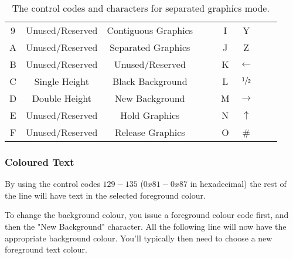 \begin{table}
\begin{tabular}{|c|c|c|c|c|c|c|c|c|}
 9 &Unused/Reserved&Contiguous Graphics		& \sepsix{\ff}{\bb}{\bb}{\ff}{\bb}{\bb} & \sepsix{\ff}{\bb}{\bb}{\ff}{\ff}{\bb} & I & Y           & \sepsix{\ff}{\bb}{\bb}{\ff}{\bb}{\ff} & \sepsix{\ff}{\bb}{\bb}{\ff}{\ff}{\ff}\\
 A &Unused/Reserved&Separated Graphics		& \sepsix{\bb}{\ff}{\bb}{\ff}{\bb}{\bb} & \sepsix{\bb}{\ff}{\bb}{\ff}{\ff}{\bb} & J & Z           & \sepsix{\bb}{\ff}{\bb}{\ff}{\bb}{\ff} & \sepsix{\bb}{\ff}{\bb}{\ff}{\ff}{\ff}\\
 B &Unused/Reserved&Unused/Reserved		& \sepsix{\ff}{\ff}{\bb}{\ff}{\bb}{\bb} & \sepsix{\ff}{\ff}{\bb}{\ff}{\ff}{\bb} & K & $\leftarrow$& \sepsix{\ff}{\ff}{\bb}{\ff}{\bb}{\ff} & \sepsix{\ff}{\ff}{\bb}{\ff}{\ff}{\ff}\\
 C &Single Height  &Black Background		& \sepsix{\bb}{\bb}{\ff}{\ff}{\bb}{\bb} & \sepsix{\bb}{\bb}{\ff}{\ff}{\ff}{\bb} & L &$\sfrac{1}{2}$& \sepsix{\bb}{\bb}{\ff}{\ff}{\bb}{\ff} & \sepsix{\bb}{\bb}{\ff}{\ff}{\ff}{\ff}\\
 D &Double Height  &New Background		& \sepsix{\ff}{\bb}{\ff}{\ff}{\bb}{\bb} & \sepsix{\ff}{\bb}{\ff}{\ff}{\ff}{\bb} & M &$\rightarrow$ & \sepsix{\ff}{\bb}{\ff}{\ff}{\bb}{\ff} & \sepsix{\ff}{\bb}{\ff}{\ff}{\ff}{\ff}\\
 E &Unused/Reserved&Hold Graphics		& \sepsix{\bb}{\ff}{\ff}{\ff}{\bb}{\bb} & \sepsix{\bb}{\ff}{\ff}{\ff}{\ff}{\bb} & N & $\uparrow$  & \sepsix{\bb}{\ff}{\ff}{\ff}{\bb}{\ff} & \sepsix{\bb}{\ff}{\ff}{\ff}{\ff}{\ff}\\
 F &Unused/Reserved&Release Graphics		& \sepsix{\ff}{\ff}{\ff}{\ff}{\bb}{\bb} & \sepsix{\ff}{\ff}{\ff}{\ff}{\ff}{\bb} & O & \#           & \sepsix{\ff}{\ff}{\ff}{\ff}{\bb}{\ff} & \sepsix{\ff}{\ff}{\ff}{\ff}{\ff}{\ff}\\ \hline
\end{tabular}
\caption{The control codes and characters for separated graphics mode.}
\label{tab:sepgraph}
\end{table}

\subsubsection*{Coloured Text}
By using the control codes $129 - 135$ ($0x81 - 0x87$ in hexadecimal) the rest of the line will
have text in the selected foreground colour.

To change the background colour, you issue a foreground colour code first, and then the "New Background" character. All the following line will now have the appropriate background colour.
You'll typically then need to choose a new foreground text colour.

